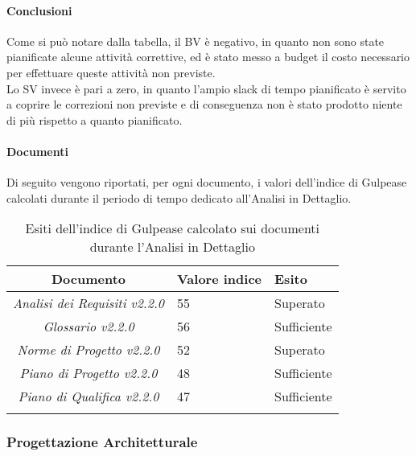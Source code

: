 \paragraph{Conclusioni}
Come si può notare dalla tabella, il BV è negativo, in quanto non sono state pianificate alcune attività correttive, ed è stato messo a budget il costo necessario per effettuare queste attività non previste.\\
Lo SV invece è pari a zero, in quanto l'ampio slack di tempo pianificato è servito a coprire le correzioni non previste e di conseguenza non è stato prodotto niente di più rispetto a quanto pianificato.
\paragraph{Documenti}
Di seguito vengono riportati, per ogni documento, i valori dell'indice di Gulpease calcolati durante il periodo di tempo dedicato all'Analisi in Dettaglio.

\begin{longtable}{|c|p{3cm}|p{3cm}|}
\toprule
\textbf{Documento} & \textbf{Valore indice} & \textbf{Esito} \\


\midrule
\emph{Analisi dei Requisiti v2.2.0} & 55 & Superato \\
\midrule
\emph{Glossario v2.2.0} & 56 & Sufficiente\\
\midrule
\emph{Norme di Progetto v2.2.0} & 52 & Superato\\
\midrule
\emph{Piano di Progetto v2.2.0} & 48 & Sufficiente \\
\midrule
\emph{Piano di Qualifica v2.2.0} & 47 & Sufficiente \\
\bottomrule
\caption{Esiti dell'indice di Gulpease calcolato sui documenti durante l'Analisi in Dettaglio}
\label{tab:changelog}
\end{longtable}

\subsubsection{Progettazione Architetturale}
